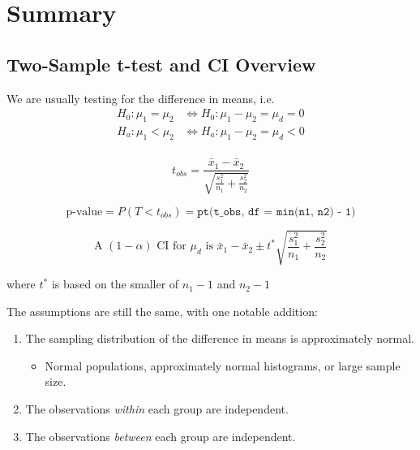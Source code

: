 \documentclass[
  letterpaper,
  DIV=11,
  numbers=noendperiod,
  oneside]{scrreprt}
\providecommand{\tightlist}{%
  \setlength{\itemsep}{0pt}\setlength{\parskip}{0pt}}\usepackage{longtable,booktabs,array}
\begin{document}
\hypertarget{summary-8}{%
\section{Summary}\label{summary-8}}

\hypertarget{two-sample-t-test-and-ci-overview}{%
\subsection{Two-Sample t-test and CI
Overview}\label{two-sample-t-test-and-ci-overview}}

We are usually testing for the difference in means, i.e. \begin{align*}
H_0: \mu_1 = \mu_2 &\Leftrightarrow H_0:\mu_1 - \mu_2 = \mu_d = 0\\
H_a: \mu_1 < \mu_2 &\Leftrightarrow H_a:\mu_1 - \mu_2 = \mu_d < 0\\
\end{align*}\vspace{-15mm}

\[
t_{obs} = \frac{\bar x_1 - \bar x_2}{\sqrt{\frac{s_1^2}{n_1} + \frac{s_2^2}{n_2}}}
\] \vspace{-10mm}

\[
\text{p-value} = P(T < t_{obs}) = \texttt{pt(t\_obs, df = min(n1, n2) - 1)}
\]

\[
\text{A $(1-\alpha)$ CI for $\mu_d$ is }\bar x_1 - \bar x_2 \pm t^*\sqrt{\frac{s_1^2}{n_1} + \frac{s_2^2}{n_2}}
\]

where \(t^*\) is based on the smaller of \(n_1 - 1\) and \(n_2 - 1\)

The assumptions are still the same, with one notable addition:

\begin{enumerate}
\def\labelenumi{\arabic{enumi}.}
\tightlist
\item
  The sampling distribution of the difference in means is approximately
  normal.

  \begin{itemize}
  \tightlist
  \item
    Normal populations, approximately normal histograms, or large sample
    size.
  \end{itemize}
\item
  The observations \emph{within} each group are independent.
\item
  The observations \emph{between} each group are independent.
\end{enumerate}
\end{document}
